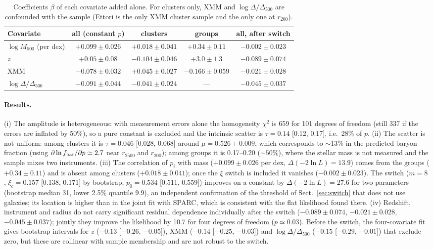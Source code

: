 \documentclass[11pt,a4paper]{article}
\newcommand{\fbar}{f_{\rm bar}}
\begin{document}
\begin{table}[h]
\centering\small
\begin{tabular}{lcccc}
\toprule
Covariate & all (constant $p$) & clusters & groups & all, after switch \\
\midrule
$\log M_{500}$ (per dex) & $+0.099\pm0.026$ & $+0.018\pm0.041$ & $+0.34\pm0.11$ & $-0.002\pm0.023$ \\
$z$ & $+0.05\pm0.08$ & $-0.104\pm0.046$ & $+3.0\pm1.3$ & $-0.089\pm0.074$ \\
XMM & $-0.078\pm0.032$ & $+0.045\pm0.027$ & $-0.166\pm0.059$ & $-0.021\pm0.028$ \\
$\log\Delta/\Delta_{500}$ & $-0.091\pm0.044$ & $-0.041\pm0.024$ & --- & $-0.045\pm0.037$ \\
\bottomrule
\end{tabular}
\caption{Coefficients $\beta$ of each covariate added alone. For clusters only, XMM and $\log\Delta/\Delta_{500}$ are confounded with the sample (Ettori is the only XMM cluster sample and the only one at $r_{200}$).}
\label{tab:hier2}
\end{table}

\paragraph{Results.} (i) The amplitude is heterogeneous: with measurement errors alone the homogeneity $\chi^2$ is 659 for 101 degrees of freedom (still 337 if the errors are inflated by 50\%), so a pure constant is excluded and the intrinsic scatter is $\tau=0.14$ [0.12, 0.17], i.e.\ 28\% of $p$. (ii) The scatter is not uniform: among clusters it is $\tau=0.046$ [0.028, 0.068] around $\mu=0.526\pm0.009$, which corresponds to $\sim13\%$ in the predicted baryon fraction (using $\partial\ln\fbar/\partial p\simeq2.7$ near $r_{2500}$ and $r_{200}$); among groups it is 0.17--0.20 ($\sim50\%$), where the stellar mass is not measured and the sample mixes two instruments. (iii) The correlation of $p_i$ with mass ($+0.099\pm0.026$ per dex, $\Delta(-2\ln L)=13.9$) comes from the groups ($+0.34\pm0.11$) and is absent among clusters ($+0.018\pm0.041$); once the $\xi$ switch is included it vanishes ($-0.002\pm0.023$). The switch ($m=8$, $\xi_c=0.157$ [0.138, 0.171] by bootstrap, $p_0=0.534$ [0.511, 0.559]) improves on a constant by $\Delta(-2\ln L)=27.6$ for two parameters (bootstrap median 31, lower 2.5\% quantile 9.9), an independent confirmation of the threshold of Sect.~\ref{sec:switch} that does not use galaxies; its location is higher than in the joint fit with SPARC, which is consistent with the flat likelihood found there. (iv) Redshift, instrument and radius do not carry significant residual dependence individually after the switch ($-0.089\pm0.074$, $-0.021\pm0.028$, $-0.045\pm0.037$); jointly they improve the likelihood by 10.7 for four degrees of freedom ($p\simeq0.03$). Before the switch, the four-covariate fit gives bootstrap intervals for $z$ ($-0.13$ [$-0.26$, $-0.05$]), XMM ($-0.14$ [$-0.25$, $-0.03$]) and $\log\Delta/\Delta_{500}$ ($-0.15$ [$-0.29$, $-0.01$]) that exclude zero, but these are collinear with sample membership and are not robust to the switch.
\end{document}
